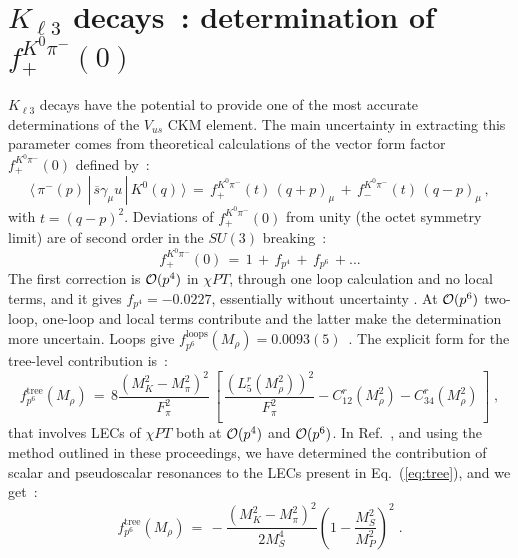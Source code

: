 \documentclass{appolb}
\begin{document}
{\section{$K_{\ell 3}$ decays~: determination of $f_+^{K^0 \pi^-}(0)$}
$K_{\ell 3}$ decays have the potential to provide one of the most accurate determinations of the $V_{us}$ CKM
element.  The main uncertainty in extracting this parameter comes from theoretical calculations of the
vector form factor $f_{+}^{K^0 \pi^-}(0)$  defined by~:
\begin{equation}
\langle \, \pi^-(p) \, | \,  \overline{s} \gamma_{\mu} u \, | \, K^0(q) \, \rangle \, = \, f_{+}^{K^0 \pi^-}(t) \, 
 (q+p)_{\mu} \, + \, 
f_{-}^{K^0 \pi^-}(t) \,  (q-p)_{\mu} \, , 
\end{equation}
with $t=(q-p)^2$. Deviations of $f_{+}^{K^0 \pi^-}(0)$ from unity (the octet symmetry limit) are of second order
in the $SU(3)$ breaking~: 
\begin{equation}
 f_{+}^{K^0 \pi^-}(0) \, = \, 1 \, + \, f_{p^4} \, + \, f_{p^6} \, + ...
\end{equation}
The first correction is ${\cal O}(p^4)$ in $\chi PT$, through one loop calculation and no local terms,
and it gives $f_{p^4} = -0.0227$, essentially without uncertainty \cite{Leutwyler:1984je}. At ${\cal O}(p^6)$
two-loop, one-loop and local terms contribute and the latter make the determination more uncertain. Loops give
$f_{p^6}^{\mathrm{loops}}(M_{\rho}) = 0.0093(5)$~\cite{Cirigliano:2005xn,Bijnens:2003uy}. The explicit form for
the tree-level contribution is~:
\begin{equation} \label{eq:tree}
f_{p^6}^{\mathrm{tree}}(M_{\rho}) \, = \, 8 \frac{\left( M_K^2 - M_{\pi}^2 \right)^2}{F_{\pi}^2} \, 
\left[ \, \frac{\left( L_5^r(M_{\rho}^2) \right)^2}{F_{\pi}^2} - C_{12}^r(M_{\rho}^2) - C_{34}^r(M_{\rho}^2) \, 
\right] \; ,
\end{equation}
that involves LECs of $\chi PT$ both at ${\cal O}(p^4)$ and ${\cal O}(p^6)$. 
In Ref.~\cite{Cirigliano:2005xn}, and using the method outlined in these proceedings, we have determined the
contribution of scalar and pseudoscalar resonances to the LECs present in Eq.~(\ref{eq:tree}), and we get~:
\begin{equation}
f_{p^6}^{\mathrm{tree}}(M_{\rho}) \, = \, - \frac{\left( M_K^2 - M_{\pi}^2 \right)^2}{2 M_S^4} \left( 1-
\frac{M_S^2}{M_P^2} \right)^2\; .
\end{equation}

\begin{figure}[!t]
\centering


\end{figure}}
\end{document}
